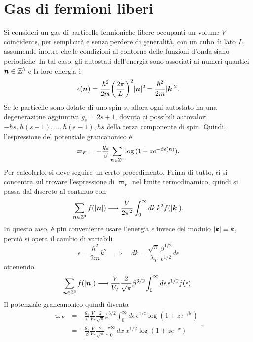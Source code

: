 \section{Gas di fermioni liberi}
Si consideri un gas di particelle fermioniche libere occupanti un volume $V$ coincidente, per semplicità e senza perdere di generalità, con un cubo di lato $L$, assumendo inoltre che le condizioni al contorno delle funzioni d'onda siano periodiche. In tal caso, gli autostati dell'energia sono associati ai numeri quantici $\bm{n} \in \mathbb{Z}^3$ e la loro energia è
\begin{equation}
    \epsilon(\bm{n}) = \frac{\hbar^2}{2m}\bigg(\frac{2\pi}{L}\bigg)^2|\bm{n}|^2 = \frac{\hbar^2}{2m}|\bm{k}|^2.
\end{equation}
Se le particelle sono dotate di uno spin $s$, allora ogni autostato ha una degenerazione aggiuntiva $g_s = 2s + 1$, dovuta ai possibili autovalori $-\hbar s,\hbar(s - 1),\dots,\hbar(s - 1),\hbar s$ della terza componente di spin. Quindi, l'espressione del potenziale grancanonico è
\begin{equation}
\label{eq: potenziale gas di fermioni (grancanonico)}
    \varpi_F = -\frac{g_s}{\beta}\sum_{\bm{n}\in\mathbb{Z}^3}\log{(1 + ze^{-\beta\epsilon(\bm{n})})}.
\end{equation}
Per calcolarlo, si deve seguire un certo procedimento. Prima di tutto, ci si concentra sul trovare l'espressione di $\varpi_F$ nel limite termodinamico, quindi si passa dal discreto al continuo con
\begin{equation}
\label{eq: passaggio al continuo gas di fermioni liberi}
    \sum_{\bm{n}\in\mathbb{Z}^3}f(|\bm{n}|) \longrightarrow \frac{V}{2\pi^2}\int_0^\infty dk\,k^2f(|\bm{k}|).
\end{equation}
In questo caso, è più conveniente usare l'energia $\epsilon$ invece del modulo $|\bm{k}| \equiv k$, perciò si opera il cambio di variabili
\begin{equation}
    \epsilon = \frac{\hbar^2}{2m}k^2\quad\Longrightarrow\quad dk = \frac{\sqrt{\pi}}{\lambda_T}\frac{\beta^{1/2}}{\epsilon^{{1/2}}}d\epsilon
\end{equation}
ottenendo
\begin{equation}
    \sum_{\bm{n}\in\mathbb{Z}^3}f(|\bm{n}|) \longrightarrow \frac{V}{V_T}\frac{2}{\sqrt{\pi}}\beta^{3/2}\int_0^\infty d\epsilon\,\epsilon^{1/2}f(\epsilon).
\end{equation}
Il potenziale grancanonico quindi diventa
\begin{equation}
    \begin{split}
        \varpi_F &= -\frac{g_s}{\beta}\frac{V}{V_T}\frac{2}{\sqrt{\pi}}\beta^{3/2}\int_0^\infty d\epsilon\,\epsilon^{1/2}\log(1 + ze^{-\beta\epsilon}) \\
        &= -\frac{g_s}{\beta}\frac{V}{V_T}\frac{2}{\sqrt{\pi}}\int_0^\infty dx\,x^{1/2}\log{(1 + ze^{-x})}
    \end{split},
\end{equation}
